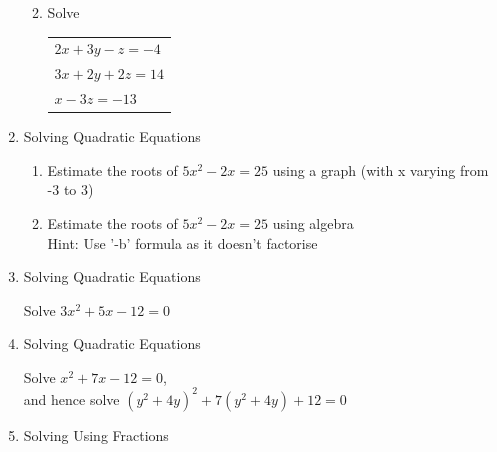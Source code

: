 \documentclass[a4paper,14pt]{extarticle}
\begin{document}
\begin{enumerate}
\begin{enumerate}
\vspace{10cm}
\vspace*{12cm}
\item{Solve
\begin{tabular}{ l } 
 $2x + 3y -z = -4$\\
 $3x + 2y + 2z = 14$\\
 $x - 3z = -13$\\ 
\end{tabular}}
\end{enumerate}
\newpage

\vspace*{12cm}
\item Solving Quadratic Equations\\[4pt]

\begin{enumerate}
\item
\par{Estimate the roots of $5x^2 - 2x = 25$ using a graph (with x varying from -3 to 3)}
\vspace{-0.6cm}
\begin{flushright}
\end{flushright}

\item
\par{Estimate the roots of $5x^2 - 2x = 25$ using algebra\\
Hint: Use '-b' formula as it doesn't factorise}
\newpage

\end{enumerate}

\item Solving Quadratic Equations\\[4pt]
\par{Solve $3x^2 + 5x - 12 = 0$}
\vspace{10cm}

\item Solving Quadratic Equations\\[4pt]
\par{Solve $x^2 + 7x - 12 = 0$,\\ 
and hence solve $(y^2 + 4y)^2 + 7(y^2 + 4y) + 12 = 0$}
\newpage

\vspace*{12cm}
\item Solving Using Fractions\\[4pt]


\end{enumerate}
\end{document}
